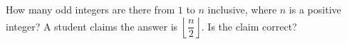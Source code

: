 How many odd integers are there from $1$ to $n$ inclusive, where $n$ is a positive integer? A student claims the answer is $\left\lfloor\dfrac n2\right\rfloor$. Is the claim correct?
